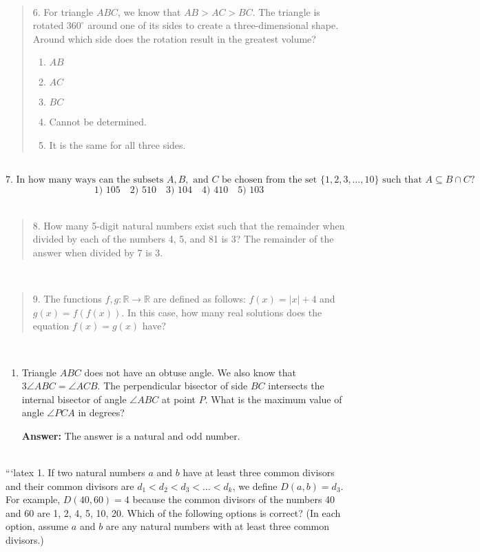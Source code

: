 \\
\begin{quote}
6. For triangle $ABC$, we know that $AB > AC > BC$. The triangle is rotated $360^\circ$ around one of its sides to create a three-dimensional shape. Around which side does the rotation result in the greatest volume? 
\begin{enumerate}
    \item $AB$
    \item $AC$
    \item $BC$
    \item Cannot be determined.
    \item It is the same for all three sides.
\end{enumerate}
\end{quote}
\\
\[
\text{7. In how many ways can the subsets } A, B, \text{ and } C \text{ be chosen from the set } \{1, 2, 3, \ldots, 10\} \text{ such that } A \subseteq B \cap C? 
\]
\[
\text{1) } 105 \quad \text{2) } 510 \quad \text{3) } 104 \quad \text{4) } 410 \quad \text{5) } 103
\]
\\
\begin{quote}
8. How many 5-digit natural numbers exist such that the remainder when divided by each of the numbers 4, 5, and 81 is 3? The remainder of the answer when divided by 7 is 3.
\end{quote}
\\
\begin{quote}
9. The functions $f, g: \mathbb{R} \to \mathbb{R}$ are defined as follows: $f(x) = |x| + 4$ and $g(x) = f(f(x))$. In this case, how many real solutions does the equation $f(x) = g(x)$ have?
\end{quote}
\\
\begin{enumerate}
    \item Triangle $ABC$ does not have an obtuse angle. We also know that $3 \angle ABC = \angle ACB$. The perpendicular bisector of side $BC$ intersects the internal bisector of angle $\angle ABC$ at point $P$. What is the maximum value of angle $\angle PCA$ in degrees?
    
    \textbf{Answer:} The answer is a natural and odd number.
\end{enumerate}
\\
```latex
1. If two natural numbers $a$ and $b$ have at least three common divisors and their common divisors are $d_1 < d_2 < d_3 < \ldots < d_k$, we define $D(a, b) = d_3$. For example, $D(40, 60) = 4$ because the common divisors of the numbers 40 and 60 are 1, 2, 4, 5, 10, 20. Which of the following options is correct? (In each option, assume $a$ and $b$ are any natural numbers with at least three common divisors.)


